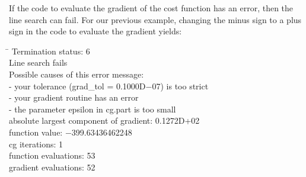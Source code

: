 \documentclass [12pt] {article}
\begin{document}
If the code to evaluate the gradient of the cost function has an error,
then the line search can fail.
For our previous example,
changing the minus sign to a plus sign in the code to evaluate the
gradient yields:
\begin{tabbing}
\hspace{2em} \= \kill
\> \sc Termination status:  6 \\
\> \sc Line search fails \\
\> \sc Possible causes of this error message: \\
\> \sc   - your tolerance (grad\_tol = 0.1000D$-$07) is too strict \\
\> \sc   - your gradient routine has an error \\
\> \sc   - the parameter epsilon in cg.part is too small \\
\> \sc absolute largest component of gradient: 0.1272D+02 \\
\> \sc function value:   $-$399.63436462248 \\
\> \sc cg iterations:  1 \\
\> \sc function evaluations:  53 \\
\> \sc gradient evaluations:  52
\end{tabbing}
\end{document}
